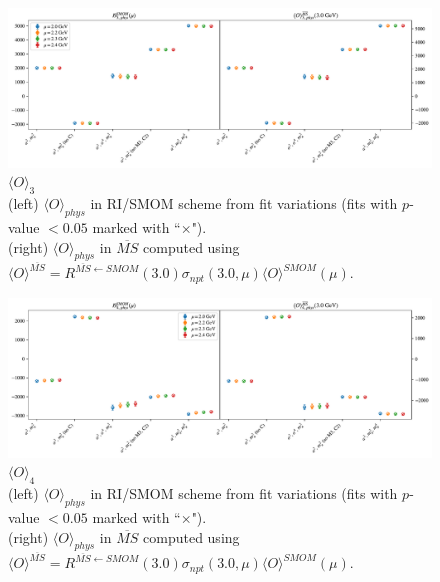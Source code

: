 \documentclass[12pt]{extarticle}
\begin{document}
\begin{figure}
\centering
\includegraphics[page=1, width=1.1\textwidth]{SSmPP/NPR/fit_summary_fq_op.pdf}
\caption{$\langle O \rangle_{3}$\\(left) $\langle O \rangle_{phys}$ in RI/SMOM scheme from fit variations (fits with $p$-value $<0.05$ marked with ``$\times$"). \\(right) $\langle O \rangle_{phys}$ in $\overline{MS}$ computed using $\langle O \rangle^{\overline{MS}} = R^{\overline{MS}\leftarrow SMOM}(3.0)\sigma_{npt}(3.0,\mu) \langle O \rangle^{SMOM}(\mu)$.}
\end{figure}
\clearpage
\begin{figure}
\centering
\includegraphics[page=1, width=1.1\textwidth]{SSpPP/NPR/fit_summary_fq_op.pdf}
\caption{$\langle O \rangle_{4}$\\(left) $\langle O \rangle_{phys}$ in RI/SMOM scheme from fit variations (fits with $p$-value $<0.05$ marked with ``$\times$"). \\(right) $\langle O \rangle_{phys}$ in $\overline{MS}$ computed using $\langle O \rangle^{\overline{MS}} = R^{\overline{MS}\leftarrow SMOM}(3.0)\sigma_{npt}(3.0,\mu) \langle O \rangle^{SMOM}(\mu)$.}
\end{figure}
\clearpage
\end{document}
